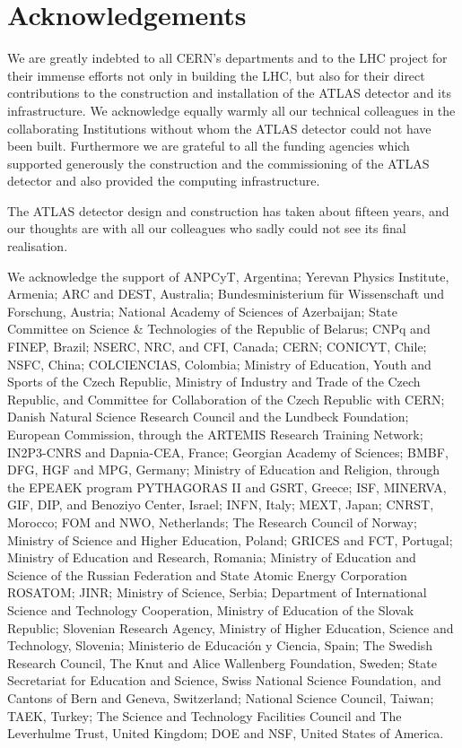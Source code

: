 \documentclass[11pt,a4paper,dvips]{article}
\begin{document}
\section{Acknowledgements}

We are greatly indebted to all CERN's departments and to the LHC project for their immense efforts not only in building the LHC, but also for their direct contributions to the construction and installation of the ATLAS detector and its infrastructure. We acknowledge equally warmly all our technical colleagues in the collaborating Institutions without whom the ATLAS detector could not have been built. Furthermore we are grateful to all the funding agencies which supported generously the construction and the commissioning of the ATLAS detector and also provided the computing infrastructure.

The ATLAS detector design and construction has taken about fifteen years, and our thoughts are with all our colleagues who sadly could not see its final realisation.

We acknowledge the support of ANPCyT, Argentina; Yerevan Physics Institute, Armenia; ARC and DEST, Australia; Bundesministerium f\"ur Wissenschaft und Forschung, Austria; National Academy of Sciences of Azerbaijan; State Committee on Science \& Technologies of the Republic of Belarus; CNPq and FINEP, Brazil; NSERC, NRC, and CFI, Canada; CERN; CONICYT, Chile; NSFC, China; COLCIENCIAS, Colombia; Ministry of Education, Youth and Sports of the Czech Republic, Ministry of Industry and Trade of the Czech Republic, and Committee for Collaboration of the Czech Republic with CERN; Danish Natural Science Research Council and the Lundbeck Foundation; European Commission, through the ARTEMIS Research Training Network; IN2P3-CNRS and Dapnia-CEA, France; Georgian Academy of Sciences; BMBF, DFG, HGF and MPG, Germany; Ministry of Education and Religion, through the EPEAEK program PYTHAGORAS II and GSRT, Greece; ISF, MINERVA, GIF, DIP, and Benoziyo Center, Israel; INFN, Italy; MEXT, Japan; CNRST, Morocco; FOM and NWO, Netherlands; The Research Council of Norway; Ministry of Science and Higher Education, Poland; GRICES and FCT, Portugal; Ministry of Education and Research, Romania; Ministry of Education and Science of the Russian Federation and State Atomic Energy Corporation ROSATOM; JINR; Ministry of Science, Serbia; Department of International Science and Technology Cooperation, Ministry of Education of the Slovak Republic; Slovenian Research Agency, Ministry of Higher Education, Science and Technology, Slovenia; Ministerio de Educaci\'{o}n y Ciencia, Spain; The Swedish Research Council, The Knut and Alice Wallenberg Foundation, Sweden; State Secretariat for Education and Science, Swiss National Science Foundation, and Cantons of Bern and Geneva, Switzerland; National Science Council, Taiwan; TAEK, Turkey; The Science and Technology Facilities Council and The Leverhulme Trust, United Kingdom; DOE and NSF, United States of America. 
\end{document}
